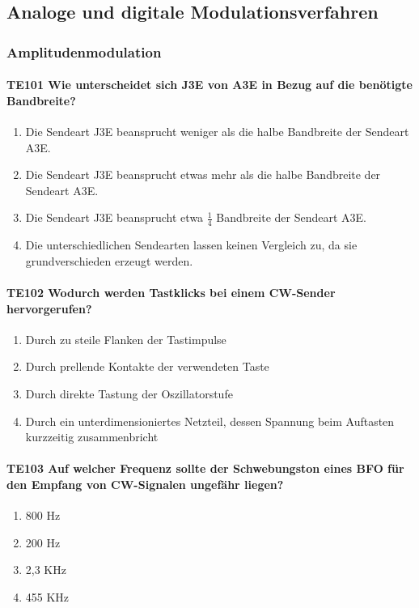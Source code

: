 \documentclass[8pt]{article}
\begin{document}
\begin{enumerate}
\begin{enumerate}[nolistsep,label=\Alph*]
\pagebreak
\subsection{Analoge und digitale Modulationsverfahren}
\subsubsection{Amplitudenmodulation}
\paragraph*{TE101 Wie unterscheidet sich J3E von A3E in Bezug auf die benötigte Bandbreite?} 
\begin{enumerate}[nolistsep,label=\Alph*]
\item Die Sendeart J3E beansprucht weniger als die halbe Bandbreite der Sendeart A3E.
\item Die Sendeart J3E beansprucht etwas mehr als die halbe Bandbreite der Sendeart A3E.
\item Die Sendeart J3E beansprucht etwa $\frac{1}{4}$ Bandbreite der Sendeart A3E.
\item Die unterschiedlichen Sendearten lassen keinen Vergleich zu, da sie grundverschieden erzeugt werden.
\end{enumerate}

\paragraph*{TE102 Wodurch werden Tastklicks bei einem CW-Sender hervorgerufen?}
\begin{enumerate}[nolistsep,label=\Alph*]
\item Durch zu steile Flanken der Tastimpulse 
\item Durch prellende Kontakte der verwendeten Taste
\item Durch direkte Tastung der Oszillatorstufe
\item Durch ein unterdimensioniertes Netzteil, dessen Spannung beim Auftasten kurzzeitig zusammenbricht
\end{enumerate}

\paragraph*{TE103 Auf welcher Frequenz sollte der Schwebungston eines BFO für den Empfang von CW-Signalen ungefähr liegen?}
\begin{enumerate}[nolistsep,label=\Alph*]
\item 800 Hz
\item 200 Hz
\item 2,3 KHz
\item 455 KHz
\end{enumerate}


\end{enumerate}
\end{enumerate}
\end{document}
